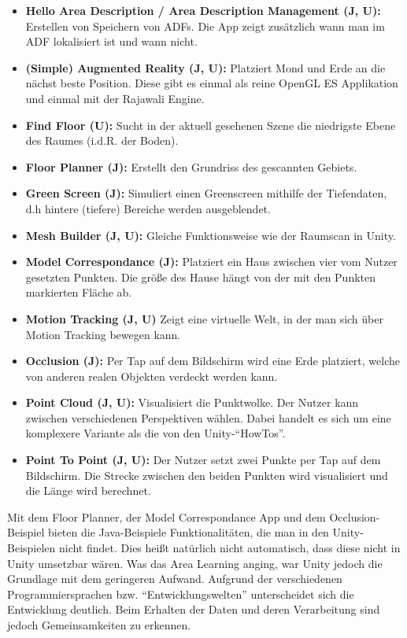 \begin{itemize}
	\item\textbf{Hello Area Description / Area Description Management (J, U):} Erstellen von Speichern von ADFs. Die App zeigt zusätzlich wann man im ADF lokalisiert ist und wann nicht.
	\item\textbf{(Simple) Augmented Reality (J, U):} Platziert Mond und Erde an die nächst beste Position. Diese gibt es einmal als reine OpenGL ES Applikation und einmal mit der Rajawali Engine.
	\item\textbf{Find Floor (U):} Sucht in der aktuell gesehenen Szene die niedrigste Ebene des Raumes (i.d.R. der Boden).
	\item\textbf{Floor Planner (J):} Erstellt den Grundriss des gescannten Gebiets.
	\item\textbf{Green Screen (J):} Simuliert einen Greenscreen mithilfe der Tiefendaten, d.h hintere (tiefere) Bereiche werden ausgeblendet.
	\item\textbf{Mesh Builder (J, U):} Gleiche Funktionsweise wie der Raumscan in Unity.
	\item\textbf{Model Correspondance (J):} Platziert ein Haus zwischen vier vom Nutzer gesetzten Punkten. Die größe des Hause hängt von der mit den Punkten markierten Fläche ab.
	\item\textbf{Motion Tracking (J, U)} Zeigt eine virtuelle Welt, in der man sich über Motion Tracking bewegen kann.
	\item\textbf{Occlusion (J):} Per Tap auf dem Bildschirm wird eine Erde platziert, welche von anderen realen Objekten verdeckt werden kann.
	\item\textbf{Point Cloud (J, U):} Visualisiert die Punktwolke. Der Nutzer kann zwischen verschiedenen Perspektiven wählen. Dabei handelt es sich um eine komplexere Variante als die von den Unity-"`HowTos"'.
	\item\textbf{Point To Point (J, U):} Der Nutzer setzt zwei Punkte per Tap auf dem Bildschirm. Die Strecke zwischen den beiden Punkten wird visualisiert und die Länge wird berechnet.
\end{itemize}

Mit dem Floor Planner, der Model Correspondance App und dem Occlusion-Beispiel bieten die Java-Beispiele Funktionalitäten, die man in den Unity-Beispielen nicht findet. Dies heißt natürlich nicht automatisch, dass diese nicht in Unity umsetzbar wären. Was das Area Learning anging, war Unity jedoch die Grundlage mit dem geringeren Aufwand. Aufgrund der verschiedenen Programmiersprachen bzw. "`Entwicklungswelten"' unterscheidet sich die Entwicklung deutlich. Beim Erhalten der Daten und deren Verarbeitung sind jedoch Gemeinsamkeiten zu erkennen.